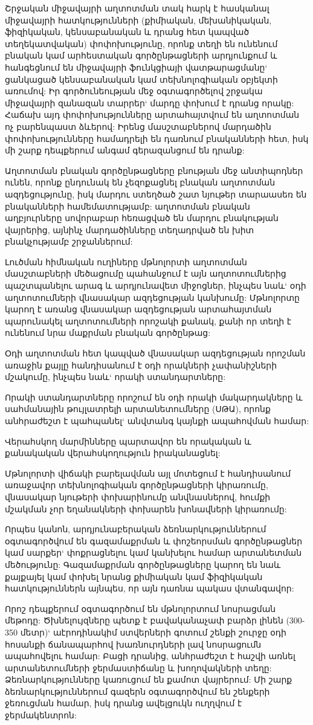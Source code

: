 \documentclass[12pt]{article}
\begin{document}
\begin{sloppypar}
Շրջական միջավայրի աղտոտման տակ հարկ է հասկանալ միջավայրի հատկությունների (քիմիական, մեխանիկական, ֆիզիկական, կենսաբանական և դրանց հետ կապված տեղեկատվական) փոփոխությունը, որոնք տեղի են ունենում բնական կամ արհեստական գործընթացների արդյունքում և հանգեցնում են միջավայրի ֆունկցիայի վատթարացմանը` ցանկացած կենսաբանական կամ տեխնոլոգիական օբյեկտի առումով: Իր գործունեության մեջ օգտագործելով շրջակա միջավայրի զանազան տարրեր` մարդը փոխում է դրանց որակը: Հաճախ այդ փոփոխությունները արտահայտվում են աղտոտման ոչ բարենպաստ ձևերով: Իրենց մասշտաբներով մարդածին փոփոխությունները համադրելի են դառնում բնականների հետ, իսկ մի շարք դեպքերում անգամ գերազանցում են դրանք:

Աղտոտման բնական գործընթացները բնության մեջ անտիպոդներ ունեն, որոնք ընդունակ են չեզոքացնել բնական աղտոտման ազդեցությունը, իսկ մարդու ստեղծած շատ նյութեր տարաասեռ են բնականների համեմատությամբ: աղտոտման բնական աղբյուրները սովորաբար հեռացված են մարդու բնակության վայրերից, այնինչ մարդածինները տեղադրված են խիտ բնակչությամբ շրջաններում:

Լուծման հիմնական ուղիները մթնոլորտի աղտոտման մասշտաբների մեծացումը պահանջում է այն աղտոտումներից պաշտպանելու արագ և արդյունավետ միջոցներ, ինչպես նաև` օդի աղտոտումների վնասակար ազդեցության կանխումը: Մթնոլորտը կարող է առանց վնասակար ազդեցության արտահայտման պարունակել աղտոտումների որոշակի քանակ, քանի որ տեղի է ունենում նրա մաքրման բնական գործընթաց:

Օդի աղտոտման հետ կապված վնասակար ազդեցության որոշման առաջին քայլը հանդիսանում է օդի որակների չափանիշների մշակումը, ինչպես նաև` որակի ստանդարտները:

Որակի ստանդարտները որոշում են օդի որակի մակարդակները և սահմանային թույլատրելի արտանետումները (ՍԹԱ), որոնք անհրաժեշտ է պահպանել` անվտանգ կայնքի ապահովման համար:

Վերահսկող մարմինները պարտավոր են որակական և քանակական վերահսկողություն իրականացնել:

Մթնոլորտի վիճակի բարելավման այլ մոտեցում է հանդիսանում առաջավոր տեխնոլոգիական գործընթացների կիրառումը, վնասակար նյութերի փոխարինումը անվնասներով, հումքի մշակման չոր եղանակների փոխարեն խոնավների կիրառումը:

Որպես կանոն, արդյունաբերական ձեռնարկություններում օգտագործվում են գազամաքրման և փոշեորսման գործընթացներ կամ սարքեր` փոքրացնելու կամ կանխելու համար արտանետման մեծությունը: Գազամաքրման գործընթացները կարող են նաև քայքայել կամ փոխել նրանց քիմիական կամ ֆիզիկական հատկություններն այնպես, որ այն դառնա պակաս վտանգավոր:

Որոշ դեպքերում օգտագործում են մթնոլորտում նոսրացման մեթոդը: Ծխնելույզները պետք է բավականաչափ բարձր լինեն (300-350 մետր)` աէրոդինակիմ ստվերների գոտում շենքի շուրջը օդի հոսանքի ճանապարհով խառնուրդների լավ նոսրացումն ապահովելու համար: Բացի դրանից, անհրաժեշտ է հաշվի առնել արտանետումների ջերմաստիճանը և խողովակների տեղը: Ձեռնարկությունները կառուցում են քամոտ վայրերում: Մի շարք ձեռնարկություններում գազերն օգտագործվում են շենքերի ջեռուցման համար, իսկ դրանց ավելցուկն ուղղվում է ջերմակենտրոն:


\end{sloppypar}
\end{document}
